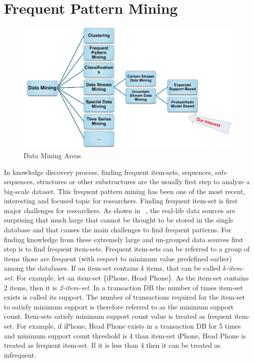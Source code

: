 \section{Frequent Pattern Mining}
\begin{figure}
\centering
  \includegraphics[width=.9\textwidth]{images/mining_class.jpg}
\caption{Data Mining Areas}
\label{figure:mining_class}
\end{figure}
In knowledge discovery process, finding frequent item-sets, sequences, sub-sequences, structures or other substructures are the usually first step to analyze a big-scale dataset. This frequent pattern mining has been one of the most recent, interesting and focused topic for researchers. Finding frequent item-set is first major challenges for researchers. As shown in ~\cite{apriori}, the real-life data sources are surprising that much large that cannot be thought to be stored in the single database and that causes the main challenges to find frequent patterns. For finding knowledge from these extremely large and un-grouped data sources first step is to find frequent item-sets. Frequent item-sets can be referred to a group of items those are frequent (with respect to minimum value predefined earlier) among the databases. If an item-set contains \emph{k} items, that can be called \emph{k-item-set}. For example, let an item-set \{iPhone, Head Phone\}. As the item-set contains 2 items, then it is \emph{2-item-set}. In a transaction DB the number of times item-set exists is called its support. The number of transactions required for the item-set to satisfy minimum support is therefore referred to as the minimum support count. Item-sets satisfy minimum support count value is treated as frequent item-set. For example, if {iPhone, Head Phone} exists in a transaction DB for 5 times and minimum support count threshold is 4 than item-set {iPhone, Head Phone} is treated as frequent item-set. If it is less than 4 then it can be treated as infrequent.\\

